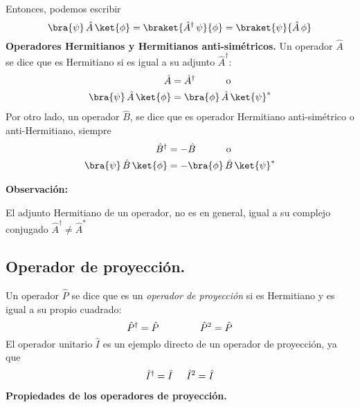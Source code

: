 Entonces, podemos escribir
\begin{equation}
\bra{\psi} \, \hat{A} \, \ket{\phi} = \braket{\hat{A}^{\dagger} \, \psi}{\phi} = \braket{\psi}{\hat{A} \, \phi}
\label{eq:ecuacion_02_69}
\end{equation}
\textbf{Operadores Hermitianos y Hermitianos anti-simétricos.}
Un operador $\hat{A}$ se dice que es Hermitiano si es igual a su adjunto $\hat{A}^{\dagger}$:
\begin{align}
\begin{aligned}
\hat{A} &= \hat{A}^{\dagger}  \hspace{1cm} \mbox{ o } \\
\bra{\psi} \, \hat{A} \, \ket{\phi} &= \bra{\phi} \, \hat{A} \, \ket{\psi}^{*}
\end{aligned}
\label{eq:ecuacion_02_70}
\end{align}
Por otro lado, un operador $\hat{B}$, se dice que es operador Hermitiano anti-simétrico o anti-Hermitiano, siempre
\begin{align}
\begin{aligned}
\hat{B}^{\dagger} &= - \hat{B}  \hspace{1cm} \mbox{ o } \\
\bra{\psi} \, \hat{B} \, \ket{\phi} &= - \bra{\phi} \, \hat{B} \, \ket{\psi}^{*}
\end{aligned}
\label{eq:ecuacion_02_71}
\end{align}

\textbf{Observación: }

El adjunto Hermitiano de un operador, no es en general, igual a su complejo conjugado $\hat{A}^{\dagger} \neq \hat{A}^{*}$
\subsection{Operador de proyección.}
Un operador $\hat{P}$ se dice que es un \emph{operador de proyección} si es Hermitiano y es igual a su propio cuadrado:
\begin{equation}
\hat{P}^{\dagger} = \hat{P} \hspace{1.5cm} \hat{P}^{2} = \hat{P}
\label{eq:ecuacion_02_76}
\end{equation}
El operador unitario $\hat{I}$ es un ejemplo directo de un operador de proyección, ya que 
\begin{align*}
\hat{I}^{\dagger} = \hat{I} \hspace{0.5cm} \hat{I}^{2} = \hat{I}
\end{align*}
\textbf{Propiedades de los operadores de proyección.}

